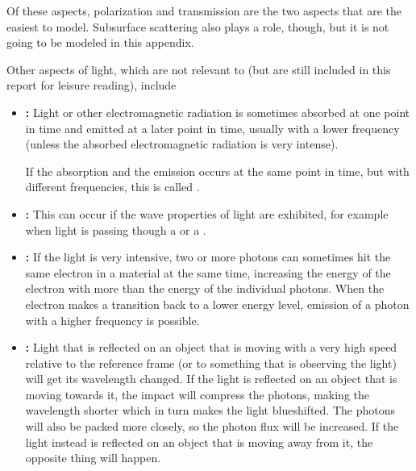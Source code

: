 Of these aspects, polarization and transmission are the two aspects that are the easiest to model. Subsurface scattering also plays a role, though, but it is not going to be modeled in this appendix.

Other aspects of light, which are not relevant to \surfacewaterrendering (but are still included in this report for leisure reading), include

\begin{itemize}
\item \textbf{:} Light or other electromagnetic radiation is sometimes absorbed at one point in time and emitted at a later point in time, usually with a lower frequency (unless the absorbed electromagnetic radiation is very intense).

If the absorption and the emission occurs at the same point in time, but with different frequencies, this is called .
    
\item \textbf{:} This can occur if the wave properties of light are exhibited, for example when light is passing though a  or a .
    
\item \textbf{:} If the light is very intensive, two or more photons can sometimes hit the same electron in a material at the same time, increasing the energy of the electron with more than the energy of the individual photons. When the electron makes a transition back to a lower energy level, emission of a photon with a higher frequency is possible.
    
\item \textbf{:} Light that is reflected on an object that is moving with a very high speed relative to the reference frame (or to something that is observing the light) will get its wavelength changed. If the light is reflected on an object that is moving towards it, the impact will compress the photons, making the wavelength shorter which in turn makes the light blueshifted. The photons will also be packed more closely, so the photon flux will be increased. If the light instead is reflected on an object that is moving away from it, the opposite thing will happen.
\end{itemize}

